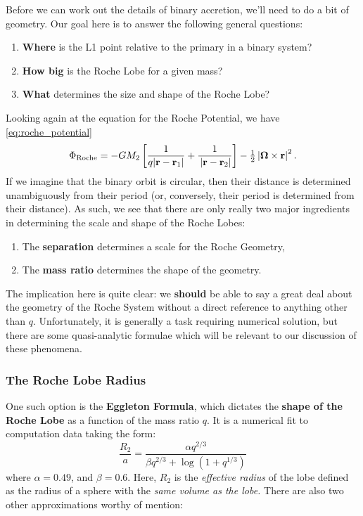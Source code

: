 Before we can work out the details of binary accretion, we'll need to do a bit of geometry. Our goal here is to answer the following general questions:
\vspace{10pt}
\begin{enumerate}
    \item \textbf{Where} is the L1 point relative to the primary in a binary system?
    \item \textbf{How big} is the Roche Lobe for a given mass?
    \item \textbf{What} determines the size and shape of the Roche Lobe?
\end{enumerate}
\vspace{10pt}
\medskip
\par
Looking again at the equation for the Roche Potential, we have \eqref{eq:roche_potential}
\[
    \Phi_{\rm Roche} =
    - GM_2 \left[\frac{1}{q|{\bf r} - {\bf r}_1|} + \frac{1}{\,|{\bf r}-{\bf r}_2|}\right]
    - \tfrac{1}{2}\left|\boldsymbol{\Omega}\times{\bf r}\right|^2.
\]
If we imagine that the binary orbit is circular, then their distance is determined unambiguously from their period (or, conversely, their period is determined from their distance). As such, we see that there are only really two major ingredients in determining the scale and shape of the Roche Lobes:
\vspace{10pt}
\begin{enumerate}
    \item The \textbf{separation} determines a scale for the Roche Geometry,
    \item The \textbf{mass ratio} determines the shape of the geometry.
\end{enumerate}
\vspace{10pt}
The implication here is quite clear: we \textbf{should} be able to say a great deal about the geometry of the Roche System without a direct reference to anything other than $q$. Unfortunately, it is generally a task requiring numerical solution, but there are some quasi-analytic formulae which will be relevant to our discussion of these phenomena.

\subsubsection{The Roche Lobe Radius}

One such option is the \textbf{Eggleton Formula}, which dictates the \textbf{shape of the Roche Lobe} as a function of the mass ratio $q$. It is a numerical fit to computation data taking the form:
\begin{equation}
\label{eq:eggleton_formula}
\boxed{
    \frac{R_2}{a} = \frac{\alpha q^{2/3}}{\beta q^{2/3} + \log(1+q^{1/3})}
    }
\end{equation}
where $\alpha = 0.49$, and $\beta = 0.6$.  Here, $R_2$ is the \textit{effective radius} of the lobe defined as the radius of a sphere with the \textit{same volume as the lobe.} There are also two other approximations worthy of mention:

